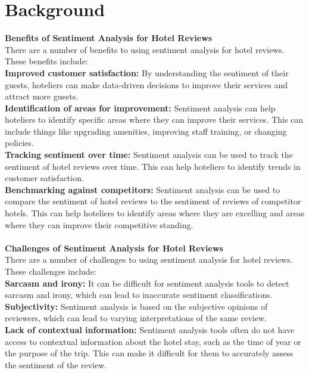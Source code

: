 \documentclass[a4paper, 12pt]{report}
\begin{document}
\section{Background}
\textbf{Benefits of Sentiment Analysis for Hotel Reviews}\\
There are a number of benefits to using sentiment analysis for hotel reviews.\\
These benefits include:\\
\textbf{Improved customer satisfaction:} By understanding the sentiment of their guests, hoteliers can make data-driven decisions to improve their services and attract more guests.\\
\textbf{Identification of areas for improvement:} Sentiment analysis can help hoteliers to identify specific areas where they can improve their services. This can include things like upgrading amenities, improving staff training, or changing policies.\\
\textbf{Tracking sentiment over time:} Sentiment analysis can be used to track the sentiment of hotel reviews over time. This can help hoteliers to identify trends in customer satisfaction.\\
\textbf{Benchmarking against competitors:} Sentiment analysis can be used to compare the sentiment of hotel reviews to the sentiment of reviews of competitor hotels. This can help hoteliers to identify areas where they are excelling and areas where they can improve their competitive standing.
\\
\\
\textbf{Challenges of Sentiment Analysis for Hotel Reviews}\\
There are a number of challenges to using sentiment analysis for hotel reviews. These challenges include:\\
\textbf{Sarcasm and irony:} It can be difficult for sentiment analysis tools to detect sarcasm and irony, which can lead to inaccurate sentiment classifications.\\
\textbf{Subjectivity:} Sentiment analysis is based on the subjective opinions of reviewers, which can lead to varying interpretations of the same review.\\
\textbf{Lack of contextual information:} Sentiment analysis tools often do not have access to contextual information about the hotel stay, such as the time of year or the purpose of the trip. This can make it difficult for them to accurately assess the sentiment of the review.
\end{document}
